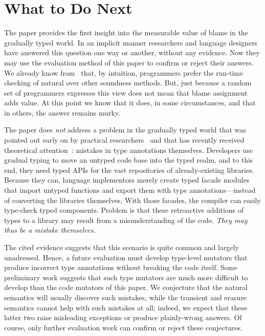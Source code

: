 \section{What to Do Next} 

The paper provides the first insight into the measurable value of blame
 in the gradually typed world. In an implicit manner researchers and
language designers have answered this question one way or another, without any
evidence. Now they may use the evaluation method of this paper to
confirm or reject their answers. We already know from~\citet{tgpk-dls-2018}
that, by intuition, programmers prefer the run-time checking of natural over
other soundness methods. But, just because a random set of programmers expresses
this view does not mean that blame assignment adds value. At this point we know
that it does, in some circumstances, and that in others, the answer remains
murky.

The paper does {\em not\/} address a problem in the gradually typed world that
was pointed out early on by practical researchers~\cite{incorrect-ts,
sta-nt-base-types, wmwz-ecoop-2017} and that has recently received theoretical
attention~\cite{gfd-oopsla-2019, cc-oopsla-20}: mistakes in type annotations themselves.
Developers use gradual typing to move an untyped code base into the typed realm,
and to this end, they need typed APIs for the vast repositories of
already-existing libraries. Because they can, language implementors merely
create typed facade modules that import untyped functions and export them with
type annotations---instead of converting the libraries themselves. With those
facades, the compiler can easily type-check typed components. Problem is
that these retroactive additions of types to a library may result from a misunderstanding of the
code. \emph{They may thus be a mistake themselves.}

The cited evidence suggests that this scenario is quite common and largely unadressed.
Hence, a future evaluation must develop type-level mutators that produce incorrect type
annotations without breaking the code itself. Some preliminary work suggests
that such type mutators are much more difficult to develop than the code
mutators of this paper. We conjecture that the natural semantics will
usually discover such mistakes, while the transient and erasure semantics cannot
help with such mistakes at all; indeed, we expect that these latter two raise
misleading exceptions or produce plainly-wrong answers.  Of course, only further
evaluation work can confirm or reject these conjectures.



